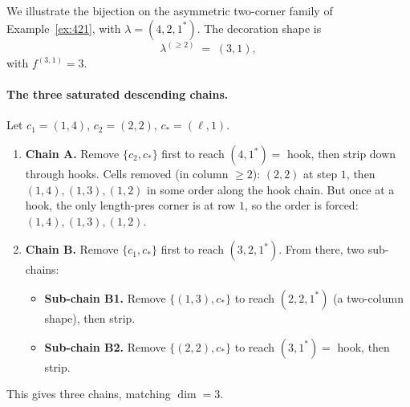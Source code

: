 \documentclass[11pt]{article}
\theoremstyle{definition}
\begin{document}
We illustrate the bijection on the asymmetric two-corner family of
Example~\ref{ex:421}, with $\lambda = (4, 2, 1^*)$. The decoration
shape is
\[
   \lambda^{(\ge 2)} \;=\; (3, 1),
\]
with $f^{(3, 1)} = 3$.

\paragraph{The three saturated descending chains.}
Let $c_1 = (1, 4)$, $c_2 = (2, 2)$, $c_* = (\ell, 1)$.
\begin{enumerate}[leftmargin=2em,topsep=0.3em,itemsep=0.2em]
\item \textbf{Chain A.} Remove $\{c_2, c_*\}$ first to reach
$(4, 1^*) = $ hook, then strip down through hooks. Cells removed
(in column $\ge 2$): $(2, 2)$ at step $1$, then $(1, 4), (1, 3), (1, 2)$
in some order along the hook chain. But once at a hook, the only
length-pres corner is at row $1$, so the order is forced:
$(1, 4), (1, 3), (1, 2)$.

\item \textbf{Chain B.} Remove $\{c_1, c_*\}$ first to reach
$(3, 2, 1^*)$. From there, two sub-chains:
\begin{itemize}[leftmargin=2em,topsep=0.2em,itemsep=0.1em]
\item \textbf{Sub-chain B1.} Remove $\{(1, 3), c_*\}$ to reach
$(2, 2, 1^*)$ (a two-column shape), then strip.
\item \textbf{Sub-chain B2.} Remove $\{(2, 2), c_*\}$ to reach
$(3, 1^*) = $ hook, then strip.
\end{itemize}
\end{enumerate}

This gives three chains, matching $\dim = 3$.
\end{document}
